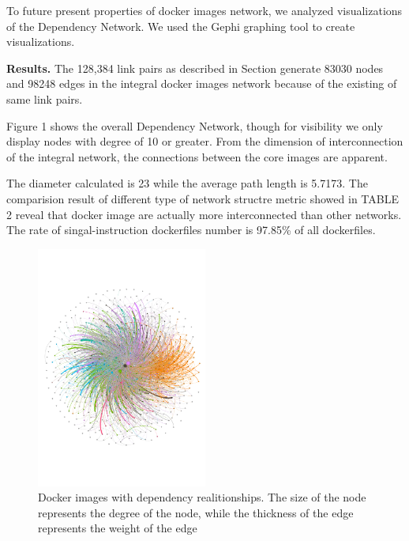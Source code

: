 \documentclass[sigconf]{acmart}
\begin{document}
To future present properties of docker images network, we analyzed visualizations of the Dependency Network. We used the Gephi graphing tool to create visualizations.


\noindent\textbf{Results. }The 128,384 link pairs as described in Section  generate 83030 nodes and 98248 edges in the integral docker images network because of the existing of same link pairs.


Figure 1 shows the overall Dependency Network, though for visibility we only display nodes with degree of 10 or greater. From the dimension of interconnection of the integral network, the connections between the core images are apparent.

The diameter calculated is 23 while the average path length is 5.7173. The comparision result of different type of network structre metric showed in TABLE 2 reveal that docker image are actually more interconnected than other networks. The rate of singal-instruction dockerfiles number is 97.85\% of all dockerfiles.


\begin{figure}[htbp]
\centerline{\includegraphics[width=0.5\textwidth,trim=0 130 0 130,clip]{picture//overview_imagenet.pdf}}
\caption{Docker images with dependency realitionships. The size of the node represents the degree of the node, while the thickness of the edge represents the weight of the edge}
\label{fig}
\end{figure}
\end{document}
